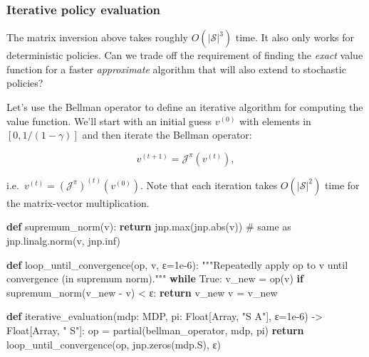 \documentclass[
  letterpaper,
  DIV=11,
  numbers=noendperiod]{scrreprt}
\newenvironment{Shaded}{\begin{snugshade}}{\end{snugshade}}
\newcommand{\BuiltInTok}[1]{\textcolor[rgb]{0.00,0.23,0.31}{#1}}
\newcommand{\CommentTok}[1]{\textcolor[rgb]{0.37,0.37,0.37}{#1}}
\newcommand{\ControlFlowTok}[1]{\textcolor[rgb]{0.00,0.23,0.31}{\textbf{#1}}}
\newcommand{\FloatTok}[1]{\textcolor[rgb]{0.68,0.00,0.00}{#1}}
\newcommand{\KeywordTok}[1]{\textcolor[rgb]{0.00,0.23,0.31}{\textbf{#1}}}
\newcommand{\NormalTok}[1]{\textcolor[rgb]{0.00,0.23,0.31}{#1}}
\newcommand{\OperatorTok}[1]{\textcolor[rgb]{0.37,0.37,0.37}{#1}}
\newcommand{\StringTok}[1]{\textcolor[rgb]{0.13,0.47,0.30}{#1}}
\newcommand{\VariableTok}[1]{\textcolor[rgb]{0.07,0.07,0.07}{#1}}
\theoremstyle{plain}
\theoremstyle{plain}
\theoremstyle{definition}
\theoremstyle{definition}
\theoremstyle{remark}
\begin{document}
\subsubsection{Iterative policy evaluation}\label{sec-iterative_pe}

The matrix inversion above takes roughly \(O(|\mathcal{S}|^3)\) time. It
also only works for deterministic policies. Can we trade off the
requirement of finding the \emph{exact} value function for a faster
\emph{approximate} algorithm that will also extend to stochastic
policies?

Let's use the Bellman operator to define an iterative algorithm for
computing the value function. We'll start with an initial guess
\(v^{(0)}\) with elements in \([0, 1/(1-\gamma)]\) and then iterate the
Bellman operator:

\[v^{(t+1)} = \mathcal{J}^{\pi}(v^{(t)}),\]

i.e.~\(v^{(t)} = (\mathcal{J}^{\pi})^{(t)} (v^{(0)})\). Note that each
iteration takes \(O(|\mathcal{S}|^2)\) time for the matrix-vector
multiplication.

\begin{Shaded}
\begin{Highlighting}[]
\KeywordTok{def}\NormalTok{ supremum\_norm(v):}
    \ControlFlowTok{return}\NormalTok{ jnp.}\BuiltInTok{max}\NormalTok{(jnp.}\BuiltInTok{abs}\NormalTok{(v))  }\CommentTok{\# same as jnp.linalg.norm(v, jnp.inf)}


\KeywordTok{def}\NormalTok{ loop\_until\_convergence(op, v, ε}\OperatorTok{=}\FloatTok{1e{-}6}\NormalTok{):}
    \CommentTok{"""Repeatedly apply op to v until convergence (in supremum norm)."""}
    \ControlFlowTok{while} \VariableTok{True}\NormalTok{:}
\NormalTok{        v\_new }\OperatorTok{=}\NormalTok{ op(v)}
        \ControlFlowTok{if}\NormalTok{ supremum\_norm(v\_new }\OperatorTok{{-}}\NormalTok{ v) }\OperatorTok{\textless{}}\NormalTok{ ε:}
            \ControlFlowTok{return}\NormalTok{ v\_new}
\NormalTok{        v }\OperatorTok{=}\NormalTok{ v\_new}


\KeywordTok{def}\NormalTok{ iterative\_evaluation(mdp: MDP, pi: Float[Array, }\StringTok{"S A"}\NormalTok{], ε}\OperatorTok{=}\FloatTok{1e{-}6}\NormalTok{) }\OperatorTok{{-}\textgreater{}}\NormalTok{ Float[Array, }\StringTok{" S"}\NormalTok{]:}
\NormalTok{    op }\OperatorTok{=}\NormalTok{ partial(bellman\_operator, mdp, pi)}
    \ControlFlowTok{return}\NormalTok{ loop\_until\_convergence(op, jnp.zeros(mdp.S), ε)}
\end{Highlighting}
\end{Shaded}
\end{document}
